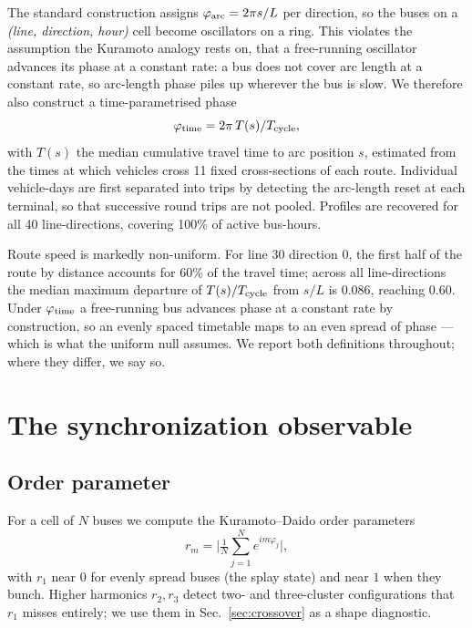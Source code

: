 \documentclass[9pt,twocolumn,twoside]{opticajnl}
\begin{document}
The standard construction assigns $\varphi_{\rm arc} = 2\pi s / L$ per direction, so the buses on
a \textit{(line, direction, hour)} cell become oscillators on a ring. This violates the
assumption the Kuramoto analogy rests on, that a free-running oscillator advances its phase at a
constant rate: a bus does not cover arc length at a constant rate, so arc-length phase piles up
wherever the bus is slow. We therefore also construct a time-parametrised phase
\begin{equation}
\varphi_{\rm time} = 2\pi\, T(s)/T_{\rm cycle},
\label{eq:timephase}
\end{equation}
with $T(s)$ the median cumulative travel time to arc position $s$, estimated from the times at
which vehicles cross 11 fixed cross-sections of each route. Individual vehicle-days are first
separated into trips by detecting the arc-length reset at each terminal, so that successive
round trips are not pooled. Profiles are recovered for all 40 line-directions, covering 100\% of
active bus-hours.

Route speed is markedly non-uniform. For line 30 direction 0, the first half of the route by
distance accounts for 60\% of the travel time; across all line-directions the median maximum
departure of $T(s)/T_{\rm cycle}$ from $s/L$ is 0.086, reaching 0.60. Under
$\varphi_{\rm time}$ a free-running bus advances phase at a constant rate by construction, so an
evenly spaced timetable maps to an even spread of phase --- which is what the uniform null
assumes. We report both definitions throughout; where they differ, we say so.

\section{The synchronization observable}\label{sec:obs}

\subsection{Order parameter}

For a cell of $N$ buses we compute the Kuramoto--Daido order parameters
\begin{equation}
r_m = \Big| \tfrac{1}{N}\sum_{j=1}^{N} e^{im\varphi_j} \Big|,
\label{eq:rm}
\end{equation}
with $r_1$ near $0$ for evenly spread buses (the splay state) and near $1$ when they bunch.
Higher harmonics $r_2, r_3$ \cite{daido90} detect two- and three-cluster configurations that
$r_1$ misses entirely; we use them in Sec.~\ref{sec:crossover} as a shape diagnostic.
\end{document}
